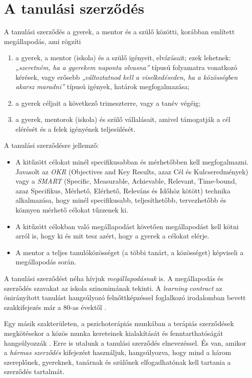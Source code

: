 \hypertarget{a-tanulasi-szerzodes}{%
\section{A tanulási szerződés}\label{a-tanulasi-szerzodes}}

A tanulási szerződés a gyerek, a mentor és a szülő közötti, korábban
említett megállapodás, ami rögzíti

\begin{enumerate}
\def\labelenumi{\arabic{enumi}.}
\item
  a gyerek, a mentor (iskola) és a szülő igényeit, elvárásait; ezek
  lehetnek: \emph{„szeretném, ha a gyerekem naponta olvasna''} típusú
  folyamatra vonatkozó kérések, vagy erősebb \emph{„változtatnod kell a
  viselkedéseden, ha a közösségben akarsz maradni''} típusú igények, határok
  megfogalmazása;
\item
  a gyerek céljait a következő trimeszterre, vagy a tanév végéig;
\item
  a gyerek, mentorok (iskola) és szülő vállalásait, amivel támogatják a
  cél elérését és a felek igényének teljesülését.
\end{enumerate}

A tanulási szerződésre jellemző:

\begin{itemize}
\item
  A kitűzött célokat minél specifikusabban és mérhetőbben kell
  megfogalmazni. Javasolt az
  {\emph{OKR}}
  (Objectives and Key
  Results, azaz Cél és Kulcseredmények) vagy a
  {\emph{SMART}} (Specific,
  Measurable, Achievable, Relevant, Time-bound, azaz Specifikus,
  Mérhető, Elérhető, Releváns és Időhöz kötött) technika alkalmazása,
  hogy minél specifikusabb, teljesíthetőbb, tervezhetőbb és könnyen
  mérhető célokat tűzzenek ki.
\item
  A kitűzött célokban való megállapodást követően megállapodást\break
  kell
  kötni arról is, hogy ki és mit tesz azért, hogy a gyerek a célokat
  elérje.
\item
  A mentor a teljes tanulóközösséget (a többi tanárt, a közösséget)
  képviseli a megállapodás során.
\end{itemize}

A tanulási szerződést néha hívjuk \emph{megállapodásnak} is. A
megállapodás és szerződés szavakat az iskola szinonimának tekinti. A
\emph{learning contract} az önirányított tanulást hangsúlyozó
felnőttképzéssel foglalkozó irodalomban bevett szakkifejezés már a 80-as
évektől {\autocite{Knowles1977}}.

Egy másik szakterületen, a pszichoterápiás munkában a terápiás
szerződések megkötésekor a közös munka kereteinek kialakítását és
fenntarthatóságát hangsúlyozzák {\autocite{Perczel2009}}. Erre is
utalunk a tanulási szerződés elnevezéssel. És van, amikor a \emph{hármas
szerződés} kifejezést használjuk, hangsúlyozva, hogy mind a három
szereplőnek, gyereknek, tanárnak és szülőnek elfogadhatónak kell
tartania a szerződés tartalmát.
